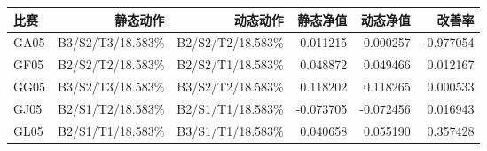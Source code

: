 \begin{tabular}{lrrrrr}
\toprule
比赛 & 静态动作 & 动态动作 & 静态净值 & 动态净值 & 改善率 \\
\midrule
GA05 & B3/S2/T3/18.583\% & B2/S2/T2/18.583\% & 0.011215 & 0.000257 & -0.977054 \\
GF05 & B2/S2/T2/18.583\% & B2/S2/T1/18.583\% & 0.048872 & 0.049466 & 0.012167 \\
GG05 & B3/S2/T3/18.583\% & B3/S2/T2/18.583\% & 0.118202 & 0.118265 & 0.000533 \\
GJ05 & B2/S1/T2/18.583\% & B2/S1/T1/18.583\% & -0.073705 & -0.072456 & 0.016943 \\
GL05 & B2/S1/T1/18.583\% & B3/S1/T1/18.583\% & 0.040658 & 0.055190 & 0.357428 \\
\bottomrule
\end{tabular}
